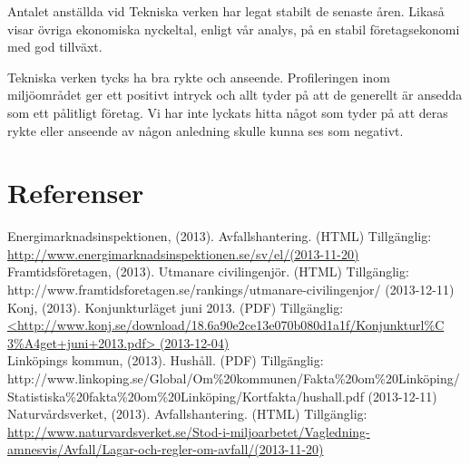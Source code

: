 \documentclass[10pt,a4paper]{article}
\begin{document}
Antalet anställda vid Tekniska verken har legat stabilt de senaste åren. Likaså
visar övriga ekonomiska nyckeltal, enligt vår analys, på en stabil
företagsekonomi med god tillväxt.

Tekniska verken tycks ha bra rykte och anseende. Profileringen inom miljöområdet
ger ett positivt intryck och allt tyder på att de generellt är ansedda som ett
pålitligt företag. Vi har inte lyckats hitta något som tyder på att deras rykte
eller anseende av någon anledning skulle kunna ses som negativt.

\newpage
\section{Referenser}


\hspace{0,5cm}Energimarknadsinspektionen, (2013). Avfallshantering. (HTML) Tillgänglig: \\
\hyperref{http://www.energimarknadsinspektionen.se/sv/el/}{}{}{http://www.energimarknadsinspektionen.se/sv/el/(2013-11-20)}\\

Framtidsföretagen, (2013). Utmanare civilingenjör. (HTML) Tillgänglig: \\
http://www.framtidsforetagen.se/rankings/utmanare-civilingenjor/ (2013-12-11)\\

Konj, (2013). Konjunkturläget juni 2013. (PDF) Tillgänglig:\\
\hyperref{http://www.konj.se/download/18.6a90e2ce13e070b080d1a1f/Konjunkturl\%C3\%A4get+juni+2013.pdf}{}{}{<http://www.konj.se/download/18.6a90e2ce13e070b080d1a1f/Konjunkturl\%C\\3\%A4get+juni+2013.pdf> (2013-12-04)}\\

Linköpings kommun, (2013). Hushåll. (PDF) Tillgänglig:\\
http://www.linkoping.se/Global/Om\%20kommunen/Fakta\%20om\%20Linköping/\\Statistiska\%20fakta\%20om\%20Linköping/Kortfakta/hushall.pdf (2013-12-11)\\

Naturvårdsverket, (2013). Avfallshantering. (HTML) Tillgänglig: \\
\hyperref{http://www.naturvardsverket.se/Stod-i-miljoarbetet/Vagledning-amnesvis/Avfall/Lagar-och-regler-om-avfall/}{}{}{http://www.naturvardsverket.se/Stod-i-miljoarbetet/Vagledning-amnesvis/Avfall/Lagar-och-regler-om-avfall/(2013-11-20)}\\
\end{document}
